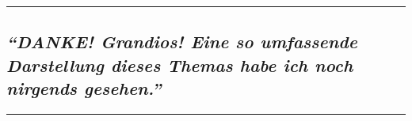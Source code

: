 \begin{center}\rule{0.5\linewidth}{\linethickness}\end{center}

\hypertarget{danke-grandios-eine-so-umfassende-darstellung-dieses-themas-habe-ich-noch-nirgends-gesehen}{%
\subsection{\texorpdfstring{\emph{``DANKE! Grandios! Eine so umfassende
Darstellung dieses Themas habe ich noch nirgends
gesehen.''}}{``DANKE! Grandios! Eine so umfassende Darstellung dieses Themas habe ich noch nirgends gesehen.''}}\label{danke-grandios-eine-so-umfassende-darstellung-dieses-themas-habe-ich-noch-nirgends-gesehen}}

\begin{center}\rule{0.5\linewidth}{\linethickness}\end{center}

